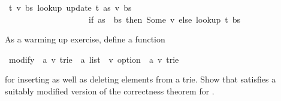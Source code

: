 \begin{isabellebody}
\isamarkuptrue%
\ {\isachardoublequote}{\isasymforall}t\ v\ bs{\isachardot}\ lookup\ {\isacharparenleft}update\ t\ as\ v{\isacharparenright}\ bs\ {\isacharequal}\isanewline
\ \ \ \ \ \ \ \ \ \ \ \ \ \ \ \ \ \ \ \ {\isacharparenleft}if\ as\ {\isacharequal}\ bs\ then\ Some\ v\ else\ lookup\ t\ bs{\isacharparenright}{\isachardoublequote}\isamarkupfalse%
\isamarkupfalse%
%
\begin{isamarkuptext}%
As a warming up exercise, define a function%
\end{isamarkuptext}%
\isamarkuptrue%
\ modify\ {\isacharcolon}{\isacharcolon}\ {\isachardoublequote}{\isacharparenleft}{\isacharprime}a{\isacharcomma}\ {\isacharprime}v{\isacharparenright}\ trie\ {\isasymRightarrow}\ {\isacharprime}a\ list\ {\isasymRightarrow}\ {\isacharprime}v\ option\ {\isasymRightarrow}\ {\isacharparenleft}{\isacharprime}a{\isacharcomma}\ {\isacharprime}v{\isacharparenright}\ trie{\isachardoublequote}\isamarkupfalse%
%
\begin{isamarkuptext}%
for inserting as well as deleting elements from a trie. Show
that  satisfies a suitably modified version of the
correctness theorem for .%
\end{isamarkuptext}%
\isamarkuptrue%
\isamarkupfalse%
\end{isabellebody}%
